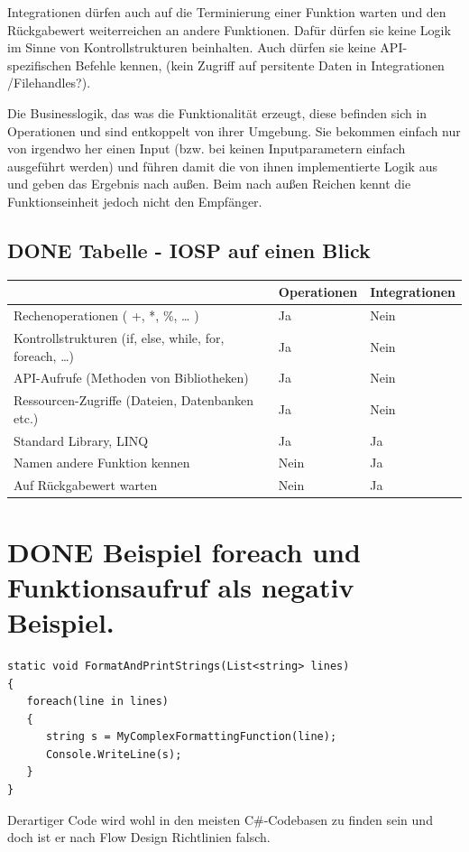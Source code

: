 \documentclass[a4paper,12pt,oneside]{book}
\begin{document}
\begin{enumerate}
Integrationen dürfen auch auf die Terminierung einer Funktion warten und den Rückgabewert  weiterreichen an andere Funktionen.
Dafür dürfen sie keine Logik im Sinne von Kontrollstrukturen beinhalten.
Auch dürfen sie keine API-spezifischen Befehle kennen, (kein Zugriff auf
persitente Daten in Integrationen /Filehandles?).

Die Businesslogik, das was die Funktionalität erzeugt, diese befinden sich in Operationen und sind entkoppelt von ihrer Umgebung.
Sie bekommen einfach nur von irgendwo her einen Input (bzw. bei keinen Inputparametern einfach ausgeführt werden) und führen damit die von ihnen implementierte
Logik aus und geben das Ergebnis nach außen. Beim nach außen Reichen kennt die Funktionseinheit jedoch nicht den Empfänger.
\end{enumerate}

\subsection{{\bfseries\sffamily DONE} Tabelle -  IOSP auf einen Blick}
\label{sec-4-1-4}
\begin{center}
\begin{tabular}{lll}
 & Operationen & Integrationen\\
\hline
Rechenoperationen ( +, *, \%, \ldots{} ) & Ja & Nein\\
Kontrollstrukturen (if, else, while, for, foreach, \ldots{}) & Ja & Nein\\
API-Aufrufe (Methoden von Bibliotheken) & Ja & Nein\\
Ressourcen-Zugriffe (Dateien, Datenbanken etc.) & Ja & Nein\\
Standard Library, LINQ & Ja & Ja\\
Namen andere Funktion kennen & Nein & Ja\\
Auf Rückgabewert warten & Nein & Ja\\
\end{tabular}
\end{center}



\section{{\bfseries\sffamily DONE} Beispiel foreach und Funktionsaufruf als negativ Beispiel.}
\label{sec-4-2}
\begin{verbatim}
static void FormatAndPrintStrings(List<string> lines)
{
   foreach(line in lines)
   {
      string s = MyComplexFormattingFunction(line);
      Console.WriteLine(s);
   }
}
\end{verbatim}
Derartiger Code wird wohl in den meisten C\#-Codebasen zu finden sein und doch ist er nach Flow Design Richtlinien falsch.
\end{document}
